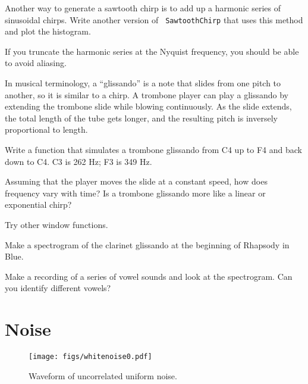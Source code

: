 \documentclass[12pt]{book}
\begin{document}
\begin{exercise}
Another way to generate a sawtooth chirp is to add up a harmonic
series of sinusoidal chirps.  Write another version of {\tt
  SawtoothChirp} that uses this method and plot the histogram.

If you truncate the harmonic series at the Nyquist frequency, you
should be able to avoid aliasing.
\end{exercise}


\begin{exercise}
In musical terminology, a ``glissando'' is a note that slides from one
pitch to another, so it is similar to a chirp.  A trombone player can
play a glissando by extending the trombone slide while blowing
continuously.  As the slide extends, the total length of the tube gets
longer, and the resulting pitch is inversely proportional to length.

Write a function that simulates a trombone glissando from C4 up to F4
and back down to C4.  C3 is 262 Hz; F3 is 349 Hz.

Assuming that the player moves the slide at a constant speed, how
does frequency vary with time?  Is a trombone glissando more like
a linear or exponential chirp?
\end{exercise}


\begin{exercise}
Try other window functions.
\end{exercise}

\begin{exercise}
Make a spectrogram of the clarinet glissando at the beginning of
Rhapsody in Blue.

\end{exercise}

\begin{exercise}
Make a recording of a series of vowel sounds and look at the spectrogram.
Can you identify different vowels?
\end{exercise}



\chapter{Noise}

\begin{figure}
\centerline{\texttt{[image: figs/whitenoise0.pdf]}}
\caption{Waveform of uncorrelated uniform noise.}
\label{fig.whitenoise0}
\end{figure}
\end{document}
